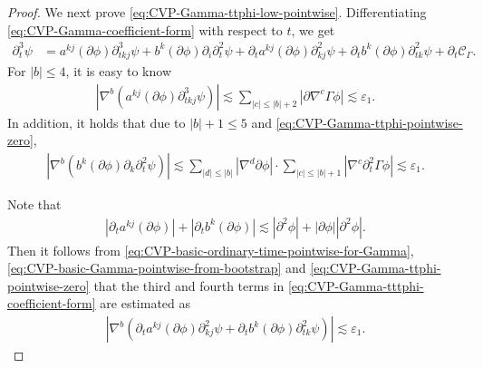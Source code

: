 \documentclass[11pt,twoside]{article}
\def\p{\partial}
\def\ve{\varepsilon}
\def\ls{\lesssim}
\theoremstyle{plain}
\theoremstyle{definition}
\theoremstyle{assumption}
\numberwithin{equation}{section}
\begin{document}
\begin{proof}
		We next prove \eqref{eq:CVP-Gamma-ttphi-low-pointwise}. Differentiating
		\eqref{eq:CVP-Gamma-coefficient-form} with respect to \(t\), we get
		\begin{equation}
			\label{eq:CVP-Gamma-tttphi-coefficient-form}
			\begin{aligned}
				\p_t^3\psi
				&=
				a^{kj}(\p\phi)\p_{tkj}^3\psi
				+
				b^k(\p\phi)\p_i\p_t^2\psi
				+
				\p_ta^{kj}(\p\phi)\p_{kj}^2\psi
				+
				\p_tb^k(\p\phi)\p_{tk}^2\psi
				+
				\p_t\mathcal C_\Gamma.
			\end{aligned}
		\end{equation}
		For \(|b|\le 4\),  it is easy to know
		\begin{equation}\label{YHC-18}
		\begin{aligned}
		|\nabla^b(a^{kj}(\p\phi)\p_{tkj}^3\psi)|\ls\sum_{|c|\le |b|+2}
		|\p\nabla^c\Gamma\phi|\ls\ve_1.
\end{aligned}
		\end{equation}		
   In addition, it holds that due to \(|b|+1\le 5\) and \eqref{eq:CVP-Gamma-ttphi-pointwise-zero},
   \begin{equation}\label{YHC-19}
		\begin{aligned}
		|\nabla^b(b^k(\p\phi)\p_k\p_t^2\psi)|\ls
		\sum_{|d|\le |b|}|\nabla^d\p\phi|\cdot
		\sum_{|c|\le |b|+1}
		|\nabla^c\p_t^2\Gamma\phi|\ls
			\ve_1.
		\end{aligned}
		\end{equation}	
		
		
		Note that
		\begin{equation}
			\label{eq:CVP-Gamma-time-derivative-coefficients}
			\begin{aligned}
				|\p_ta^{kj}(\p\phi)|
				+|\p_tb^k(\p\phi)|
				\ls|\p^2\phi|
				+|\p\phi||\p^2\phi|.
			\end{aligned}
		\end{equation}
		Then it follows from \eqref{eq:CVP-basic-ordinary-time-pointwise-for-Gamma},
		\eqref{eq:CVP-basic-Gamma-pointwise-from-bootstrap} and
		\eqref{eq:CVP-Gamma-ttphi-pointwise-zero} that the third and fourth terms in
		\eqref{eq:CVP-Gamma-tttphi-coefficient-form} are estimated as
\begin{equation}\label{YHC-20}
			\begin{aligned}
			|\nabla^b(\p_ta^{kj}(\p\phi)\p_{kj}^2\psi
				+\p_tb^k(\p\phi)\p_{tk}^2\psi)|\ls
			\ve_1.
			\end{aligned}
		\end{equation}

		
		

\end{proof}
\end{document}
